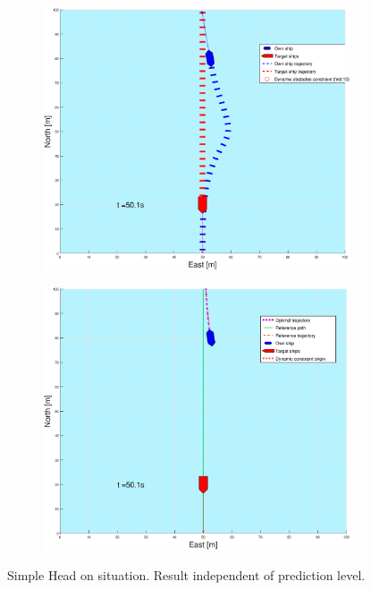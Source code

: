 \begin{figure}[ht!]
\begin{subfigure}[b]{0.499\textwidth}
    \end{subfigure}
    \hfill
    \\
    \begin{subfigure}[b]{0.49\textwidth}
        \centering
        \includegraphics[width=\textwidth]{Images/Figures/enkel_HO/_Simple_0fig1_time=50}
    \end{subfigure}
    \hfill
    \begin{subfigure}[b]{0.499\textwidth}
        \centering
        \includegraphics[width=\textwidth]{Images/Figures/enkel_HO/_Simple_0fig999_time=50}
    \end{subfigure}
    \hfill
    \caption{Simple Head on situation. Result independent of prediction level.}
\end{figure}%
